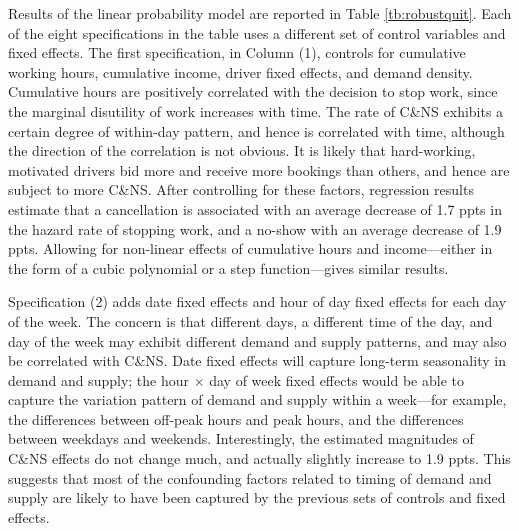 \documentclass[reviewmode]{restud}
\begin{document}
Results of the linear probability model are reported in Table \ref{tb:robustquit}. Each of the eight specifications in the table uses a different set of control variables and fixed effects. The first specification, in Column (1), controls for cumulative working hours, cumulative income, driver fixed effects, and demand density.
Cumulative hours are positively correlated with the decision to stop work, since the marginal disutility of work increases with time. The rate of C\&NS exhibits a certain degree of within-day pattern, and hence is correlated with time, although the direction of the correlation is not obvious. It is likely that hard-working, motivated drivers bid more and receive more bookings than others, and hence are subject to more C\&NS. After controlling for these factors, regression results estimate that a cancellation is associated with an average decrease of 1.7 ppts in the hazard rate of stopping work, and a no-show with an average decrease of 1.9 ppts. Allowing for non-linear effects of cumulative hours and income---either in the form of a cubic polynomial or a step function---gives similar results.

Specification (2) adds date fixed effects and hour of day fixed effects for each day of the week. The concern is that different days, a different time of the day, and day of the week may exhibit different demand and supply patterns, and may also be correlated with C\&NS. Date fixed effects will capture long-term seasonality in demand and supply; the hour $\times$ day of week fixed effects would be able to capture the variation pattern of demand and supply within a week---for example, the differences between off-peak hours and peak hours, and the differences between weekdays and weekends. Interestingly, the estimated magnitudes of C\&NS effects do not change much, and actually slightly increase to 1.9 ppts. This suggests that most of the confounding factors related to timing of demand and supply are likely to have been captured by the previous sets of controls and fixed effects. 
\end{document}
